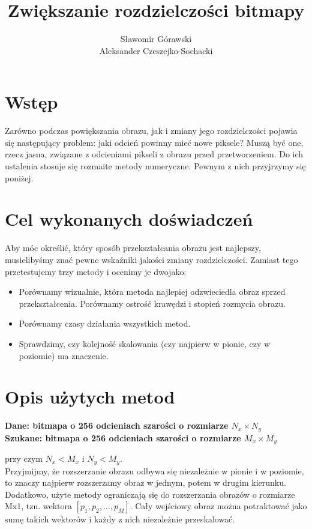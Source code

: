 \documentclass[a4paper,10pt]{article}
\title{Zwiększanie rozdzielczości bitmapy}
\author{Sławomir Górawski\\ Aleksander Czeszejko-Sochacki}
\begin{document}
 \maketitle
 \section{Wstęp}
 Zarówno podczas powiększania obrazu, jak i zmiany jego
 rozdzielczości pojawia się następujący problem: jaki odcień 
 powinny mieć nowe piksele? Muszą być one, rzecz jasna, związane
 z odcieniami pikseli z obrazu przed przetworzeniem. Do ich
 ustalenia stosuje się rozmaite metody numeryczne. Pewnym z nich
 przyjrzymy się poniżej.
 
 \section{Cel wykonanych doświadczeń}
 Aby móc określić, który sposób przekształcania obrazu jest
 najlepszy, musielibyśmy znać pewne wskaźniki jakości zmiany
 rozdzielczości. Zamiast tego przetestujemy trzy metody
 i ocenimy je dwojako:
 \begin{itemize}
  \item Porównamy wizualnie, która metoda najlepiej
  odzwieciedla obraz sprzed przekształcenia. Porównamy ostrość
  krawędzi i stopień rozmycia obrazu.
  \item Porównamy czasy działania wszystkich metod.
  \item Sprawdzimy, czy kolejność skalowania (czy najpierw
  w pionie, czy w poziomie) ma znaczenie.
 \end{itemize}
 
 \section{Opis użytych metod}
  \begin{center}
   \textbf{Dane: bitmapa o 256 odcieniach szarości o rozmiarze $N_x\times N_y$\\
   Szukane: bitmapa o 256 odcieniach szarości o rozmiarze $M_x\times M_y$}\\
  \end{center}
  
  przy czym $N_x < M_x$ i $N_y < M_y$.\\
  
  Przyjmijmy, że rozszerzanie obrazu odbywa się niezależnie
  w pionie i w poziomie, to znaczy najpierw rozszerzamy obraz
  w jednym, potem w drugim kierunku. Dodatkowo, użyte metody
  ograniczają się do rozszerzania obrazów o rozmiarze Mx1, tzn.
  wektora $[p_1, p_2, \dots, p_M]$. Cały wejściowy obraz można
  potraktować jako sumę takich wektorów i każdy z nich 
  niezależnie przeskalować.
  
\end{document}
